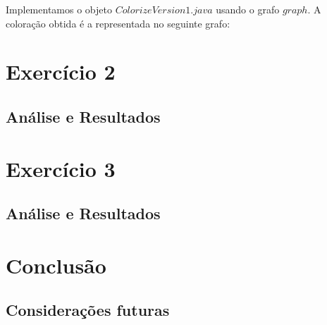 \documentclass[a4paper,12pt]{report}
\begin{document}
Implementamos o objeto $ColorizeVersion1.java$ usando o grafo $graph$.
A coloração obtida é a representada no seguinte grafo:



\chapter{Exercício 2}

\section{Análise e Resultados}

\chapter{Exercício 3}

\section{Análise e Resultados}

\chapter{Conclusão}

\section{Considerações futuras}
\end{document}
